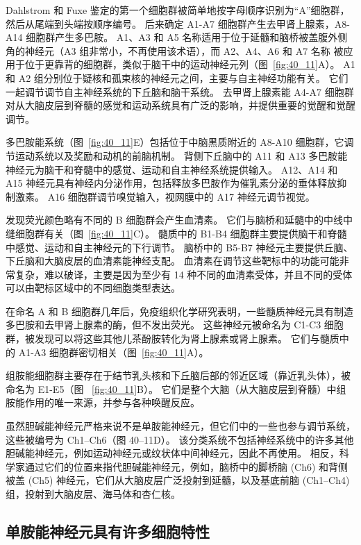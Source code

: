 Dahlstrom 和 Fuxe 鉴定的第一个细胞群被简单地按字母顺序识别为“A”细胞群，然后从尾端到头端按顺序编号。
后来确定 A1-A7 细胞群产生去甲肾上腺素，A8-A14 细胞群产生多巴胺。
A1、A3 和 A5 名称适用于位于延髓和脑桥被盖腹外侧角的神经元（A3 组非常小，不再使用该术语），而 A2、A4、A6 和 A7 名称 被应用于位于更靠背的细胞群，类似于脑干中的运动神经元列（图~\ref{fig:40_11}A）。
A1 和 A2 组分别位于疑核和孤束核的神经元之间，主要与自主神经功能有关。
它们一起调节调节自主神经系统的下丘脑和脑干系统。
去甲肾上腺素能 A4-A7 细胞群对从大脑皮层到脊髓的感觉和运动系统具有广泛的影响，并提供重要的觉醒和觉醒调节。


多巴胺能系统（图~\ref{fig:40_11}E）包括位于中脑黑质附近的 A8-A10 细胞群，它调节运动系统以及奖励和动机的前脑机制。
背侧下丘脑中的 A11 和 A13 多巴胺能神经元为脑干和脊髓中的感觉、运动和自主神经系统提供输入。
A12、A14 和 A15 神经元具有神经内分泌作用，包括释放多巴胺作为催乳素分泌的垂体释放抑制激素。
A16 细胞群调节嗅觉输入，视网膜中的 A17 神经元调节视觉。


发现荧光颜色略有不同的 B 细胞群会产生血清素。
它们与脑桥和延髓中的中线中缝细胞群有关（图~\ref{fig:40_11}C）。
髓质中的 B1-B4 细胞群主要提供脑干和脊髓中感觉、运动和自主神经元的下行调节。
脑桥中的 B5-B7 神经元主要提供丘脑、下丘脑和大脑皮层的血清素能神经支配。
血清素在调节这些靶标中的功能可能非常复杂，难以破译，主要是因为至少有 14 种不同的血清素受体，并且不同的受体可以由靶标区域中的不同细胞类型表达。


在命名 A 和 B 细胞群几年后，免疫组织化学研究表明，一些髓质神经元具有制造多巴胺和去甲肾上腺素的酶，但不发出荧光。
这些神经元被命名为 C1-C3 细胞群，被发现可以将这些其他儿茶酚胺转化为肾上腺素或肾上腺素。
它们与髓质中的 A1-A3 细胞群密切相关（图~\ref{fig:40_11}A）。


组胺能细胞群主要存在于结节乳头核和下丘脑后部的邻近区域（靠近乳头体），被命名为 E1-E5（图 ~\ref{fig:40_11}B）。
它们是整个大脑（从大脑皮层到脊髓）中组胺能作用的唯一来源，并参与各种唤醒反应。


虽然胆碱能神经元严格来说不是单胺能神经元，但它们中的一些也参与调节系统，这些被编号为 Ch1–Ch6（图 40–11D）。
该分类系统不包括神经系统中的许多其他胆碱能神经元，例如运动神经元或纹状体中间神经元，因此不再使用。
相反，科学家通过它们的位置来指代胆碱能神经元，例如，脑桥中的脚桥脑 (Ch6) 和背侧被盖 (Ch5) 神经元，它们从大脑皮层广泛投射到延髓，以及基底前脑 (Ch1–Ch4) 组，投射到大脑皮层、海马体和杏仁核。



\subsection{单胺能神经元具有许多细胞特性}

